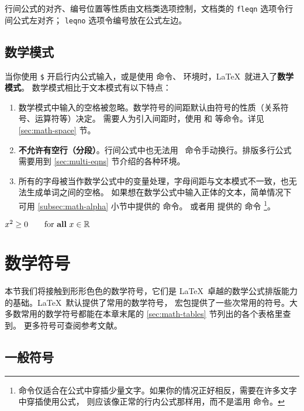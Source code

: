 行间公式的对齐、编号位置等性质由文档类选项控制，文档类的 \texttt{fleqn} 选项令行间公式左对齐；
\texttt{leqno} 选项令编号放在公式左边。

\subsection{数学模式}\label{subsec:math-mode}

当你使用 \texttt\$ 开启行内公式输入，或是使用 \cmd{[} 命令、 环境时，\LaTeX\ 就进入了\textbf{数学模式}。
数学模式相比于文本模式有以下特点：
\begin{enumerate}
  \item 数学模式中输入的空格被忽略。数学符号的间距默认由符号的性质（关系符号、运算符等）决定。
  需要人为引入间距时，使用  和  等命令。详见 \ref{sec:math-space} 节。
  \item \textbf{不允许有空行（分段）}。行间公式中也无法用 \crcmd\ 命令手动换行。排版多行公式需要用到
  \ref{sec:multi-eqns} 节介绍的各种环境。
  \item 所有的字母被当作数学公式中的变量处理，字母间距与文本模式不一致，也无法生成单词之间的空格。
  如果想在数学公式中输入正体的文本，简单情况下可用 \ref{subsec:math-alpha} 小节中提供的  命令。
  或者用  提供的  命令%
  \footnote{ 命令仅适合在公式中穿插少量文字。如果你的情况正好相反，需要在许多文字中穿插使用公式，
  则应该像正常的行内公式那样用，而不是滥用  命令。}。
\end{enumerate}
\begin{example}
$x^{2} \geq 0 \qquad
\text{for \textbf{all} }
x\in\mathbb{R}$
\end{example}

\section{数学符号}\label{sec:math-symbols}

\def\msym#1{$\csname #1\endcsname$ (\cmd{#1})}

本节我们将接触到形形色色的数学符号，它们是 \LaTeX\ 卓越的数学公式排版能力的基础。\LaTeX\ 默认提供了常用的数学符号，
 宏包提供了一些次常用的符号。大多数常用的数学符号都能在本章末尾的 \ref{sec:math-tables} 节列出的各个表格里查到。
更多符号可查阅参考文献\cite{symbols}。

\subsection{一般符号}\label{subsec:math-general}

